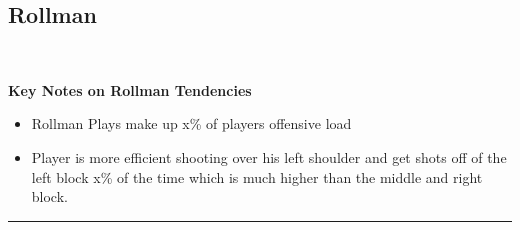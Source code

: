 \documentclass[a4paper,12pt]{article}
\begin{document}
\clearpage




\subsection{Rollman}\

\vspace{0.25em} %
\textbf{Key Notes on Rollman Tendencies}
\vspace{0.5em} %

\begin{itemize}
    \item Rollman Plays make up x\% of players offensive load
    \vspace{0.3em} %
    \item Player is more efficient shooting over his left shoulder and get shots off of the left block x\% of the time which is much higher than the middle and right block.
\end{itemize}

\vspace{1em} %
\hrule height 1pt width 1\textwidth %
\vspace{0em} %
\end{document}
